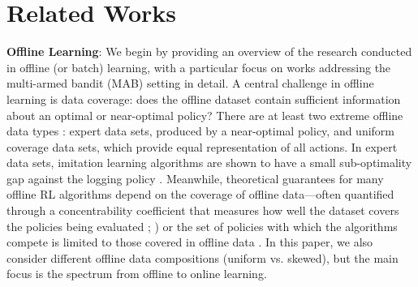 \section{Related Works}
\textbf{Offline Learning}: We begin by providing an overview of the research conducted in offline (or batch) learning, with a particular focus on works addressing the multi-armed bandit (MAB) setting in detail. A central challenge in offline learning is data coverage: does the offline dataset contain sufficient information about an optimal or near-optimal policy? There are at least two extreme offline data types \citep{rashidinejad2023bridgingofflinereinforcementlearning}: expert data sets, produced by a near-optimal policy, and uniform coverage data sets, which provide equal representation of all actions. In expert data sets, imitation learning algorithms are shown to have a small sub-optimality gap against the logging policy \citep{Imitationlearningross,rajaraman2020fundamentallimitsimitationlearning}. Meanwhile, theoretical guarantees for many offline RL algorithms depend on the coverage of offline data—often quantified through a concentrability coefficient that measures how well the dataset covers the policies being evaluated \citep{rashidinejad2023bridgingofflinereinforcementlearning}; \cite{rashidinejad2023bridgingofflinereinforcementlearning}) or the set of policies with which the algorithms compete is limited to those covered in offline data \citep{cheng2022adversarially,  yin2020nearoptimalprovableuniformconvergence}. In this paper, we also consider different offline data compositions (uniform vs. skewed), but the main focus is the spectrum from offline to online learning.



